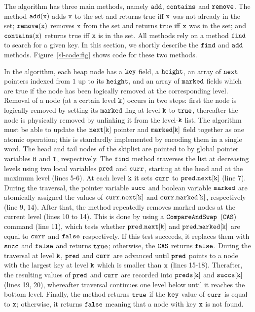 The algorithm has three main methods, namely $\tt add$, $\tt contains$ and $\tt remove$. The method $\tt add(x)$ adds $\tt x$ to the set and returns true iff $\tt x$ was not already in the set; $\tt remove(x)$ removes $\tt x$ from the set and returns true iff ${\tt x}$ was in the set; and $\tt contains(x)$
returns true iff $\tt x$ is in the set.
All methods rely on a method $\tt find$ to search for a given key. 
In this section, we shortly describe the $\tt find$ and $\tt add$ methods.
Figure~\ref{sl-code:fig} shows code for these two methods.
\vspace*{-0.6cm}




\vspace*{-0.6cm}

In the algorithm, each heap node has a $\tt key$ field, a $\tt height$, an array of $\tt next$ pointers indexed from
$1$ up to its $\tt height$, and an array of $\tt marked$ fields which are true if the node has been logically removed at the corresponding level. Removal of a node (at a certain level ${\tt k}$) occurs in two steps: first the node is logically removed by setting its $\tt marked$ flag at level ${\tt k}$ to $\tt true$, thereafter the node is physically removed by unlinking it from the level-${\tt k}$ list. The algorithm must be able to update the $\tt next[k]$ pointer and $\tt marked[k]$ field together as one atomic operation; this is standardly implemented by encoding them in a single word. The head and tail nodes of the skiplist are pointed to by global pointer variables $\tt H$ and $\tt T$, respectively. The $\tt find$ method traverses the list at decreasing levels using two local variables $\tt pred$ and $\tt curr$, starting at the head and at 
the maximum level (lines 5-6). At each level $\tt k$ it sets $\tt curr$ to $\tt pred.next[k]$ (line 7). During the traversal, the pointer variable $\tt succ$ and boolean variable $\tt marked$ are atomically assigned the values of $\tt curr.next[k]$ and $\tt curr.marked[k]$, respectively (line 9, 14). After that, the method repeatedly removes marked nodes at the current level (lines 10 to 14). This is done by using a $\tt CompareAndSwap$ $\tt (CAS)$ command (line 11), which tests whether $\tt pred.next[k]$ and $\tt pred.marked[k]$ are equal to $\tt curr$ and $\tt false$ respectively. If this test succeeds, it replaces them with $\tt succ$ and $\tt false$ and returns $\tt true$; otherwise, the $\tt CAS$ returns $\tt false$. During the traversal at level $\tt k$, $\tt pred$ and $\tt curr$ are advanced until $\tt pred$ points to a node with the largest key at level $\tt k$ which is smaller than $\tt x$ (lines 15-18). Therafter, the resulting values of $\tt pred$ and $\tt curr$ are recorded into $\tt preds[k]$ and $\tt succs[k]$ (lines 19, 20), whereafter traversal continues one level below until it reaches the bottom level. Finally, the
method returns $\tt true$ if the $\tt key$ value of $\tt curr$ is equal to $\tt x$; otherwise, it returns $\tt false$ meaning that a node with key $\tt x$ is not found.


